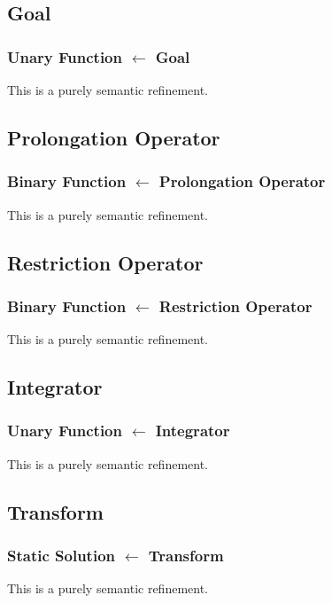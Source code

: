 \documentclass{article}
\begin{document}
\subsection{Goal}
\subsubsection{Unary Function $\leftarrow$ Goal}
This is a purely semantic refinement.

\subsection{Prolongation Operator}
\subsubsection{Binary Function $\leftarrow$ Prolongation Operator}
This is a purely semantic refinement.

\subsection{Restriction Operator}
\subsubsection{Binary Function $\leftarrow$ Restriction Operator}
This is a purely semantic refinement.

\subsection{Integrator}
\subsubsection{Unary Function $\leftarrow$ Integrator}
This is a purely semantic refinement.

\subsection{Transform}
\subsubsection{Static Solution $\leftarrow$ Transform}
This is a purely semantic refinement.
\end{document}
